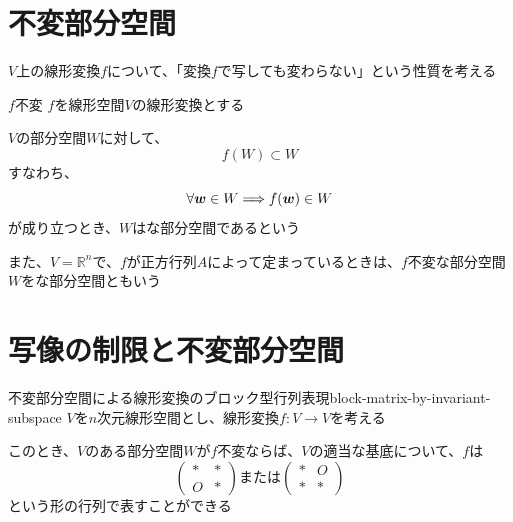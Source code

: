 \documentclass[../../../topic_linear-algebra]{subfiles}
\begin{document}
\sectionline
\section{不変部分空間}

\begin{mindflow}
\end{mindflow}

$V$上の線形変換$f$について、「変換$f$で写しても変わらない」という性質を考える

\begin{definition*}{$f$不変}
  $f$を線形空間$V$の線形変換とする

  $V$の部分空間$W$に対して、
  \begin{equation*}
    f(W) \subset W
  \end{equation*}
  すなわち、
  \begin{equation*}
    \forall\vb*{w} \in W \Longrightarrow f(\vb*{w}) \in W
  \end{equation*}
  が成り立つとき、$W$はな部分空間であるという

  \br

  また、$V=\mathbb{R}^n$で、$f$が正方行列$A$によって定まっているときは、$f$不変な部分空間$W$をな部分空間ともいう
\end{definition*}

\sectionline
\section{写像の制限と不変部分空間}

\begin{mindflow}
\end{mindflow}

\begin{theorem}{不変部分空間による線形変換のブロック型行列表現}{block-matrix-by-invariant-subspace}
  $V$を$n$次元線形空間とし、線形変換$f\colon V \to V$を考える

  このとき、$V$のある部分空間$W$が$f$不変ならば、$V$の適当な基底について、$f$は
  \begin{equation*}
    \begin{pmatrix}
      * & * \\
      O & *
    \end{pmatrix} \text{または}
    \begin{pmatrix}
      * & O \\
      * & *
    \end{pmatrix}
  \end{equation*}
  という形の行列で表すことができる
\end{theorem}
\end{document}
